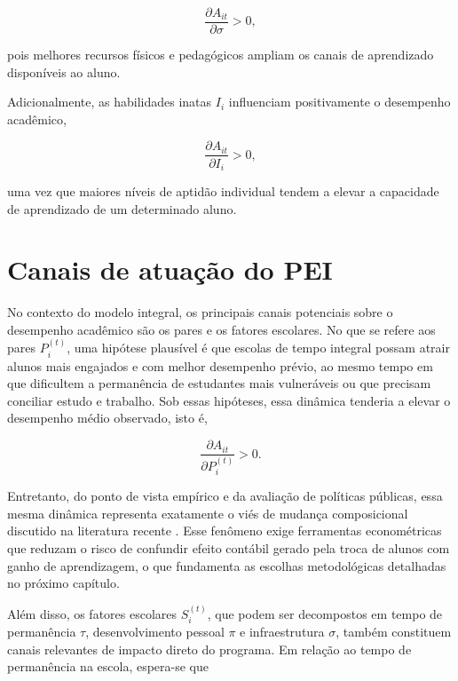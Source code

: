 \begin{equation*}
\frac{\partial A_{it}}{\partial \sigma} > 0,
\end{equation*}

pois melhores recursos físicos e pedagógicos ampliam os canais de aprendizado disponíveis ao aluno.

Adicionalmente, as habilidades inatas $I_{i}$ influenciam positivamente o desempenho acadêmico,

\begin{equation*}
\frac{\partial A_{it}}{\partial I_{i}} > 0,
\end{equation*}

uma vez que maiores níveis de aptidão individual tendem a elevar a capacidade de aprendizado de um determinado aluno.

\section{Canais de atuação do PEI}

No contexto do modelo integral, os principais canais potenciais sobre o desempenho acadêmico são os pares e os fatores escolares. No que se refere aos pares $P_{i}^{(t)}$, uma hipótese plausível é que escolas de tempo integral possam atrair alunos mais engajados e com melhor desempenho prévio, ao mesmo tempo em que dificultem a permanência de estudantes mais vulneráveis ou que precisam conciliar estudo e trabalho. Sob essas hipóteses, essa dinâmica tenderia a elevar o desempenho médio observado, isto é,

\begin{equation*}
\frac{\partial A_{it}}{\partial P_{i}^{(t)}} > 0.
\end{equation*}

Entretanto, do ponto de vista empírico e da avaliação de políticas públicas, essa mesma dinâmica representa exatamente o viés de mudança composicional discutido na literatura recente \cite{favaro_composicao_pei}. Esse fenômeno exige ferramentas econométricas que reduzam o risco de confundir efeito contábil gerado pela troca de alunos com ganho de aprendizagem, o que fundamenta as escolhas metodológicas detalhadas no próximo capítulo.

Além disso, os fatores escolares $S_{i}^{(t)}$, que podem ser decompostos em tempo de permanência $\tau$, desenvolvimento pessoal $\pi$ e infraestrutura $\sigma$, também constituem canais relevantes de impacto direto do programa. Em relação ao tempo de permanência na escola, espera-se que

